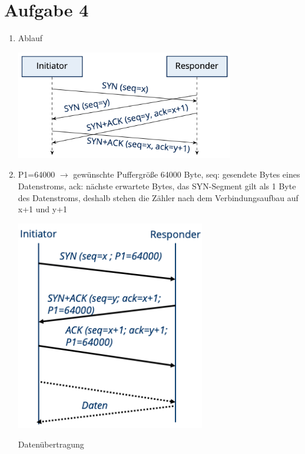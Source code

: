 \documentclass{article}
\begin{document}
	\section*{Aufgabe 4}
	\begin{enumerate}[label=(\alph*)]
		\item Ablauf
		\begin{center}
			\includegraphics[width=0.75\textwidth]{./pics/gleichzeitig-TCP}
		\end{center}
		\item P1=64000 $\to$ gewünschte Puffergröße 64000 Byte, seq: gesendete Bytes eines Datenstroms, ack: nächste erwartete Bytes, das SYN-Segment gilt als 1 Byte des Datenstroms, deshalb stehen die Zähler nach dem Verbindungsaufbau auf x+1 und y+1
		\begin{center}
			\includegraphics[width=0.65\textwidth]{./pics/TCPP-Verbindungsaufbau}
		\end{center}
		Datenübertragung
		\begin{center}

\end{center}
\end{enumerate}
\end{document}
